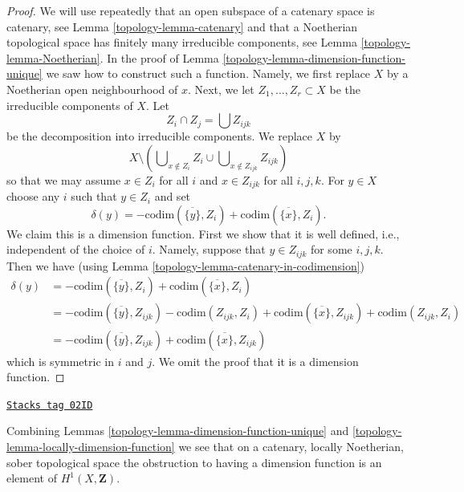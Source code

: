\begin{proof}

We will use repeatedly
that an open subspace of a catenary space is catenary, see
Lemma \ref{topology-lemma-catenary} and that a Noetherian topological space
has finitely many irreducible components, see Lemma \ref{topology-lemma-Noetherian}.
In the proof of Lemma \ref{topology-lemma-dimension-function-unique} we saw how to
construct such a function. Namely, we first replace $X$ by a Noetherian
open neighbourhood of $x$. Next, we let $Z_1, \ldots, Z_r \subset X$
be the irreducible components of $X$. Let
$$
Z_i \cap Z_j = \bigcup Z_{ijk}
$$
be the decomposition into irreducible components. We replace
$X$ by
$$
X \setminus \left(
\bigcup\nolimits_{x \not \in Z_i} Z_i
\cup
\bigcup\nolimits_{x \not \in Z_{ijk}} Z_{ijk}
\right)
$$
so that we may assume $x \in Z_i$ for all $i$ and
$x \in Z_{ijk}$ for all $i, j, k$. For $y \in X$ choose any
$i$ such that $y \in Z_i$ and set
$$
\delta(y) = - \text{codim}(\overline{\{y\}}, Z_i)
+ \text{codim}(\overline{\{x\}}, Z_i).
$$
We claim this is a dimension function. First we show that it
is well defined, i.e., independent of the choice of $i$.
Namely, suppose that $y \in Z_{ijk}$ for some $i, j, k$.
Then we have (using Lemma \ref{topology-lemma-catenary-in-codimension})
\begin{align*}
\delta(y) & =
- \text{codim}(\overline{\{y\}}, Z_i)
+ \text{codim}(\overline{\{x\}}, Z_i) \\
& =
- \text{codim}(\overline{\{y\}}, Z_{ijk})
- \text{codim}(Z_{ijk}, Z_i)
+ \text{codim}(\overline{\{x\}}, Z_{ijk})
+ \text{codim}(Z_{ijk}, Z_i) \\
& =
- \text{codim}(\overline{\{y\}}, Z_{ijk})
+ \text{codim}(\overline{\{x\}}, Z_{ijk})
\end{align*}
which is symmetric in $i$ and $j$.
We omit the proof that it is a dimension function.
\end{proof}

\begin{remark}
\label{topology-remark-obstruction-to-dimension-function}
\href{https://stacks.math.columbia.edu/tag/02ID}{\texttt{Stacks tag 02ID}}

Combining Lemmas \ref{topology-lemma-dimension-function-unique} and
\ref{topology-lemma-locally-dimension-function} we see that on a catenary,
locally Noetherian, sober topological space the obstruction to
having a dimension function is an element of
$H^1(X, \mathbf{Z})$.
\end{remark}

